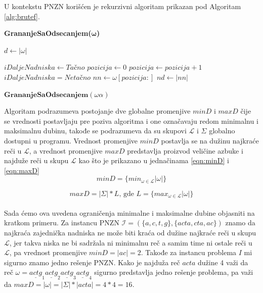 \documentclass[12pt,oneside]{memoir}
\begin{document}
U kontekstu PNZN korišćen je rekurzivni algoritam prikazan pod Algoritam \ref{alg:brutef}.
\begin{algorithm}
  \caption{\textbf{GrananjeSaOdsecanjem($\bm{\omega}$)}}
  \label{alg:brutef}
  \begin{algorithmic}[1]
  \State $d \gets |\omega|$ 
      \State \Return
  \EndIf

      \State $iDaljeNadniska \gets Ta\textrm{č}no$
      \State $pozicija \gets 0$
       
          \State $pozicija \gets pozicija + 1$
        \Else
          \State $iDaljeNadniska = Neta\textrm{č}no$
        \EndIf
      \EndWhile
      \State $nn \gets \omega[pozicija:]$ 
      \State $nd \gets |nn|$ 
  \EndIf

  \For{$\alpha \in \Sigma$} 
        \State $\textbf{GrananjeSaOdsecanjem}(\omega\alpha)$
  \EndFor
  \end{algorithmic}
  \end{algorithm}
Algoritam podrazumeva postojanje dve globalne promenjive $minD$ i $maxD$ čije se vrednosti postavljaju pre
poziva algoritma i one označavaju redom minimalnu i maksimalnu dubinu, takođe se podrazumeva da su skupovi $\mathcal{L}$
i $\Sigma$ globalno dostupni u programu. Vrednost promenjive $minD$ postavlja
se na dužinu najkraće reči u $\mathcal{L}$, a vrednost promenjive $maxD$ predstavlja proizvod veličine azbuke
i najduže reči u skupu $\mathcal{L}$ kao što je prikazano u jednačinama \ref{eqn:minD} i \ref{eqn:maxD}
\\
\begin{equation}
  \label{eqn:minD}
  minD=\{min_{\omega\in\mathcal{L}}|\omega|\}
\end{equation}

\begin{equation}
  \label{eqn:maxD}
  maxD=|\Sigma| * L \textrm{, gde } L=\{max_{\omega\in\mathcal{L}}|\omega|\}
\end{equation}
\\
Sada ćemo ova uvedena ograničenja minimalne i maksimalne dubine objasniti na kratkom primeru.
Za instancu PNZN $\mathcal{I}=(\{a,c,t,g\},\{acta,cta,ac\})$ znamo da najkraća zajednička nadniska
ne može biti kraća od dužine najkraće reči u skupu $\mathcal{L}$, jer takva niska ne bi sadržala ni
minimalnu reč a samim time ni ostale reči u $\mathcal{L}$, pa vrednost promenjive $minD=|ac|=2$. Takođe za 
instancu problema $I$ mi sigurno znamo jedno rešenje PNZN. Kako je najduža reč $acta$ dužine 4 
važi da reč $\omega=\underline{actg}_{1}\underline{actg}_{2}\underline{actg}_{3}\underline{actg}_{4}$
sigurno predstavlja jedno rešenje problema, pa važi da $maxD=|\omega|=|\Sigma|*|acta| = 4 * 4 = 16$.
\end{document}
